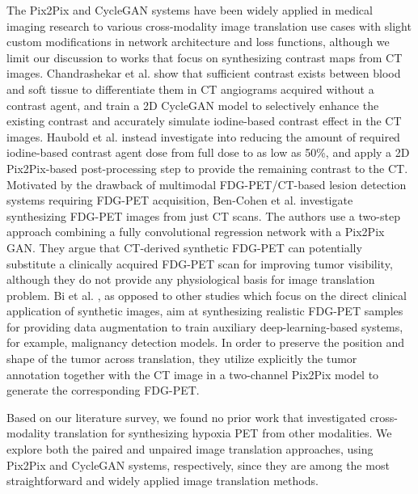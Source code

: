 The Pix2Pix and CycleGAN systems have been widely applied in medical imaging research to various cross-modality image translation use cases \cite{yi2019generative} with slight custom modifications in network architecture and loss functions, although we limit our discussion to works that focus on synthesizing contrast maps from CT images. Chandrashekar et al. \cite{chandrashekar2020deep} show that sufficient contrast exists between blood and soft tissue to differentiate them in CT angiograms acquired without a contrast agent, and train a 2D CycleGAN model to selectively enhance the existing contrast and accurately simulate iodine-based contrast effect in the CT images. Haubold et al. \cite{haubold2021contrast} instead investigate into reducing the amount of required iodine-based contrast agent dose from full dose to as low as 50\%, and apply a 2D Pix2Pix-based post-processing step to provide the remaining contrast to the CT. Motivated by the drawback of multimodal FDG-PET/CT-based lesion detection systems requiring FDG-PET acquisition, Ben-Cohen et al. \cite{bencohen2018crossmodality} investigate synthesizing FDG-PET images from just CT scans. The authors use a two-step approach combining a fully convolutional regression network with a Pix2Pix GAN. They argue that CT-derived synthetic FDG-PET can potentially substitute a clinically acquired FDG-PET scan for improving tumor visibility, although they do not provide any physiological basis for image translation problem. Bi et al. \cite{bi2017synthesis}, as opposed to other studies which focus on the direct clinical application of synthetic images, aim at synthesizing realistic FDG-PET samples for providing data augmentation to train auxiliary deep-learning-based systems, for example, malignancy detection models. In order to preserve the position and shape of the tumor across translation, they utilize explicitly the tumor annotation together with the CT image in a two-channel Pix2Pix model to generate the corresponding FDG-PET. 

Based on our literature survey, we found no prior work that investigated cross-modality translation for synthesizing hypoxia PET from other modalities. We explore both the paired and unpaired image translation approaches, using Pix2Pix and CycleGAN systems, respectively, since they are among the most straightforward and widely applied image translation methods.



